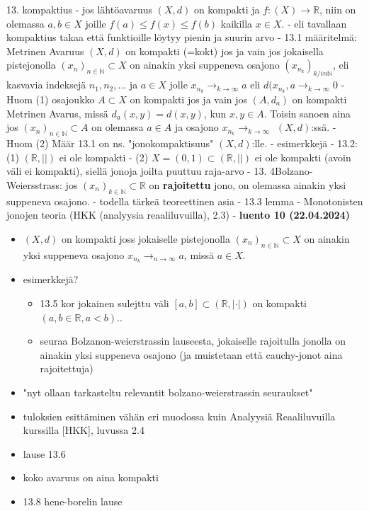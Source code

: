 \documentclass[12pt,a4paper,leqno]{amsart}
\begin{document}
13. kompaktius
- jos lähtöavaruus $(X, d)$ on kompakti ja $f: (X) \rightarrow \mathbb{R}$, niin on olemassa $a, b \in X$ joille $f(a) \leq f(x) \leq f(b)$ kaikilla $x \in X$.
  - eli tavallaan kompaktius takaa että funktioille löytyy pienin ja suurin arvo
  - 13.1 määritelmä: Metrinen Avaruus $(X, d)$ on kompakti (=kokt) jos ja vain jos jokaisella pistejonolla $(x_{n})_{n \in \mathbb{N}} \subset X$ on ainakin yksi suppeneva osajono $(x_{n_k})_{k/in \mathbb{N}}$, eli kasvavia indeksejä $n_1, n_2, ...$ ja $a \in X$ jolle $x_{n_k} \rightarrow_{k \rightarrow \infty} a$ eli $d(x_{n_k}, a \rightarrow_{k \rightarrow \infty} 0$
    - Huom (1) osajoukko $A \subset X$ on kompakti jos ja vain jos $(A, d_a)$ on kompakti Metrinen Avarus, missä $d_a(x, y) = d(x, y)$, kun $x, y \in A$. Toisin sanoen aina jos $(x_n)_{n \in \mathbb{N}} \subset A$ on olemassa $a \in A$ ja osajono $x_{n_k} \to_{k \to \infty}$  $(X, d)$:ssä.
    - Huom (2) Määr 13.1 on ns. "jonokompaktisuus" $(X, d)$:lle.
  - esimerkkejä
    - 13.2: (1) $(\mathbb{R}, ||)$ ei ole kompakti
    - (2) $X=(0, 1) \subset (\mathbb{R}, ||)$ ei ole kompakti (avoin väli ei kompakti), siellä jonoja joilta puuttuu raja-arvo
    - 13. 4Bolzano-Weiersstrass: jos $(x_n)_{k \in \mathbb{N}} \subset \mathbb{R}$ on \textbf{rajoitettu} jono, on olemassa ainakin yksi suppeneva osajono.
      - todella tärkeä teoreettinen asia
- 13.3 lemma
-    Monotonisten jonojen teoria (HKK (analyysia reaaliluvuilla), 2.3)
- 
\textbf{luento 10 (22.04.2024) }
\begin{itemize}
    \item $(X, d)$ on kompakti joss jokaiselle pistejonolla $(x_n)_{n \in \mathbb{N}} \subset X$ on ainakin yksi suppeneva osajono $x_{n_k} \to_{n \to \infty} a$, missä $a \in X$. 
    \item  esimerkkejä?
    \begin{itemize}
        \item 13.5 kor jokainen sulejttu väli $[a, b] \subset (\mathbb{R}, |\cdot |)$ on kompakti $(a, b \in \mathbb{R}, a < b)$..
        \item seuraa Bolzanon-weierstrassin lauseesta, jokaiselle rajoitulla jonolla on ainakin yksi suppeneva osajono (ja muistetaan että cauchy-jonot aina rajoitettuja)
    \end{itemize}
    \item "nyt ollaan tarkasteltu relevantit bolzano-weierstrassin seuraukset"
    \item tuloksien esittäminen vähän eri muodossa kuin Analyysiä Reaaliluvuilla kurssilla [HKK], luvussa 2.4
    \item lause 13.6
    \item koko avaruus on aina kompakti
    \item 13.8 hene-borelin lause
\end{itemize}
\end{document}
